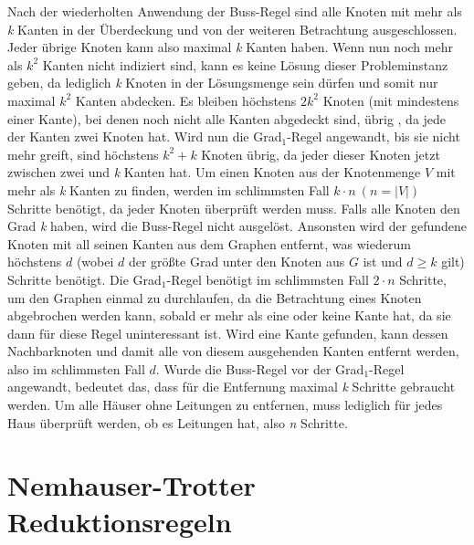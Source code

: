 Nach der wiederholten Anwendung der Buss-Regel sind alle Knoten mit mehr als \emph{k} Kanten in der Überdeckung und von der weiteren Betrachtung ausgeschlossen. Jeder übrige Knoten kann also maximal \emph{k} Kanten haben. Wenn nun noch mehr als $k^{2}$ Kanten nicht indiziert sind, kann es keine Lösung dieser Probleminstanz geben, da lediglich \emph{k} Knoten in der Lösungsmenge sein dürfen und somit nur maximal $k^{2}$ Kanten  abdecken. Es bleiben höchstens $2 k^{2}$ Knoten (mit mindestens einer Kante), bei denen noch nicht alle Kanten abgedeckt sind, übrig \cite{param}, da jede der Kanten zwei Knoten hat. Wird nun die Grad$_{1}$-Regel angewandt, bis sie nicht mehr greift, sind höchstens $k^{2} + k$ Knoten übrig, da jeder dieser Knoten jetzt zwischen zwei und \emph{k} Kanten hat.
Um einen Knoten aus der Knotenmenge $V$ mit mehr als \emph{k} Kanten zu finden, werden im schlimmsten Fall $k \cdot n\ (n=|V|)$ Schritte benötigt, da jeder Knoten überprüft werden muss. Falls alle Knoten den Grad \emph{k} haben, wird die Buss-Regel nicht ausgelöst. Ansonsten wird der gefundene Knoten mit all seinen Kanten aus dem Graphen entfernt, was wiederum höchstens $d$ (wobei $d$ der größte Grad unter den Knoten aus $G$ ist und $d \geq k$ gilt) Schritte benötigt. Die Grad$_{1}$-Regel benötigt im schlimmsten Fall $2 \cdot n$ Schritte, um den Graphen einmal zu durchlaufen, da die Betrachtung eines Knoten abgebrochen werden kann, sobald er mehr als eine oder keine Kante hat, da sie dann für diese Regel uninteressant ist. Wird eine Kante gefunden, kann dessen Nachbarknoten und damit alle von diesem ausgehenden Kanten entfernt werden, also im schlimmsten Fall $d$. Wurde die Buss-Regel vor der Grad$_{1}$-Regel angewandt, bedeutet das, dass für die Entfernung maximal \emph{k} Schritte gebraucht werden. Um alle Häuser ohne Leitungen zu entfernen, muss lediglich für jedes Haus überprüft werden, ob es Leitungen hat, also \emph{n} Schritte.

\section{Nemhauser-Trotter Reduktionsregeln}
\label{ch:Grundlagen:sec:Nemhauser-Trotter Reduktionsregeln}

